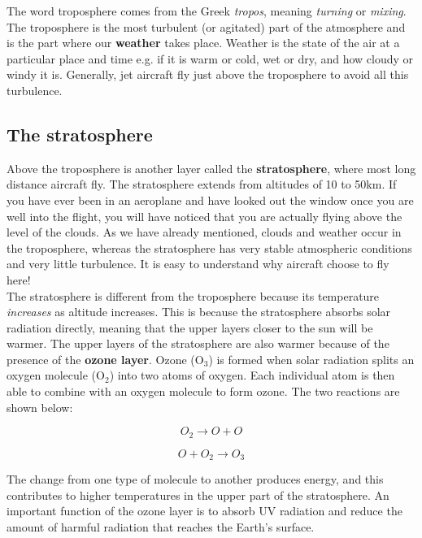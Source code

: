 The word troposphere comes from the Greek \textit{tropos}, meaning \textit{turning} or \textit{mixing}. The troposphere is the most turbulent (or agitated) part of the atmosphere and is the part where our \textbf{weather} takes place. Weather is the state of the air at a particular place and time e.g. if it is warm or cold, wet or dry, and how cloudy or windy it is. Generally, jet aircraft fly just above the troposphere to avoid all this turbulence. \\

\subsection{The stratosphere}

Above the troposphere is another layer called the \textbf{stratosphere}, where most long distance aircraft fly. The stratosphere extends from altitudes of 10 to 50km. If you have ever been in an aeroplane and have looked out the window once you are well into the flight, you will have noticed that you are actually flying above the level of the clouds. As we have already mentioned, clouds and weather occur in the troposphere, whereas the stratosphere has very stable atmospheric conditions and very little turbulence. It is easy to understand why aircraft choose to fly here! \\

The stratosphere is different from the troposphere because its temperature \textit{increases} as altitude increases. This is because the stratosphere absorbs solar radiation directly, meaning that the upper layers closer to the sun will be warmer. The upper layers of the stratosphere are also warmer because of the presence of the \textbf{ozone layer}. Ozone (O$_{3}$) is formed when solar radiation splits an oxygen molecule (O$_{2}$) into two atoms of oxygen. Each individual atom is then able to combine with an oxygen molecule to form ozone. The two reactions are shown below:


\begin{equation*}
O_{2} \rightarrow O + O
\end{equation*}

\begin{equation*}
O + O_{2} \rightarrow O_{3}
\end{equation*}



The change from one type of molecule to another produces energy, and this contributes to higher temperatures in the upper part of the stratosphere. An important function of the ozone layer is to absorb UV radiation and reduce the amount of harmful radiation that reaches the Earth's surface. 

